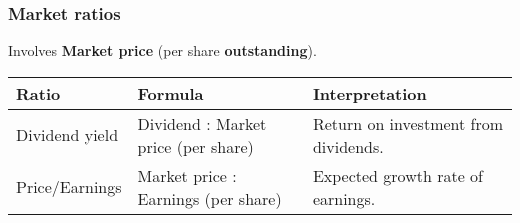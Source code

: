 \subsubsection{Market ratios}

Involves \textbf{Market price} (per share \textbf{outstanding}).

\begin{table}[H]
    \centering
    \begin{tabular}{p{}p{}p{}}
        \hline
        \textbf{Ratio} & \textbf{Formula}                    & \textbf{Interpretation}              \\
        \hline
        Dividend yield & Dividend : Market price (per share) & Return on investment from dividends. \\
        \hline
        Price/Earnings & Market price : Earnings (per share) & Expected growth rate of earnings.    \\
        \hline
    \end{tabular}
\end{table}